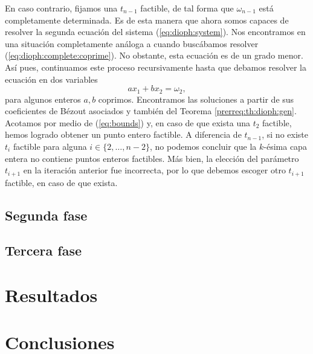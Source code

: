 \documentclass[11pt]{article}
\begin{document}
En caso contrario, fijamos una $t_{n-1}$ factible, de tal forma que $\omega_{n-1}$ está
completamente determinada. Es de esta manera que ahora somos capaces de resolver la segunda ecuación
del sistema (\ref{eq:dioph:system}). Nos encontramos en una situación completamente análoga a cuando
buscábamos resolver (\ref{eq:dioph:complete:coprime}). No obstante, esta ecuación es de un grado
menor. Así pues, continuamos este proceso recursivamente hasta que debamos
resolver la ecuación en dos variables
\begin{equation*}
	ax_1 + bx_2 = \omega_2,
\end{equation*}
para algunos enteros $a, b$ coprimos. Encontramos las soluciones a partir de sus coeficientes de
Bézout asociados y también del Teorema \ref{prerreq:th:dioph:gen}. Acotamos por medio de (\ref{eq:bounds})
y, en caso de que exista una $t_2$ factible, hemos logrado obtener un punto entero factible. A
diferencia de $t_{n - 1}$, si no existe $t_i$ factible para alguna $i \in \{2, \ldots, n - 2\}$, no
podemos concluir que la $k$-ésima capa entera no contiene puntos enteros factibles. Más bien, la
elección del parámetro $t_{i + 1}$ en la iteración anterior fue incorrecta, por lo que debemos
escoger otro $t_{i + 1}$ factible, en caso de que exista.


\subsection*{Segunda fase}
\subsection*{Tercera fase}

\section*{Resultados}
\section*{Conclusiones}



\end{document}
